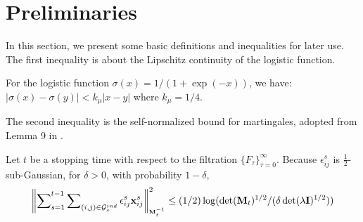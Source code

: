 
\section{Preliminaries}
In this section, we present some basic definitions and inequalities for later use.
The first inequality is about the Lipschitz continuity of the logistic function.
\begin{lemma} For the logistic function $\sigma(x) = {1}/{(1 + \exp(-x))}$, we have:
$|\sigma(x) - \sigma(y)| < k_{\mu} |x - y|$
where $k_{\mu} = 1/4$.
\label{lemma:lipt}
\end{lemma}

The second inequality is the self-normalized bound for martingales, adopted from Lemma 9 in \cite{abbasi2011improved}.

\begin{lemma}
\label{lemma:martigale}
Let $t$ be a stopping time with respect to the filtration $\{F_\tau\}^\infty_{\tau=0}$. Because $\epsilon_{ij}^s$ is $\frac{1}{2}$-sub-Gaussian, for $\delta > 0$, with probability $1-\delta$,
\small
\begin{equation*}
    \left\| \sum\nolimits_{s=1}^{t-1}\sum\nolimits_{(i, j)\in \mathcal{G}_s^{ind}} \epsilon_{ij}^s\mathbf{x}^s_{ij}\right\|_{\scriptscriptstyle \mathbf{M}_t^{-1}}^2 \leq ({1}/{2})\log({{\det(\mathbf{M}_t)^{1/2}}/{(\delta \det(\lambda\mathbf{I})^{1/2})}})
\end{equation*}
\normalsize
\end{lemma}

